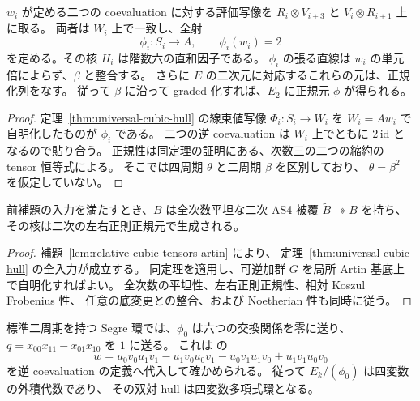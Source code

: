 \begin{lemma}
\label{lem:relative-canonical-hull-functional}
$w_i$ が定める二つの coevaluation に対する評価写像を
$R_i\otimes V_{i+3}$ と $V_i\otimes R_{i+1}$ 上に取る。
両者は $W_i$ 上で一致し、全射
\[
 \phi_i:S_i\longrightarrow A,\qquad \phi_i(w_i)=2
\]
を定める。その核 $H_i$ は階数六の直和因子である。
$\phi_i$ の張る直線は $w_i$ の単元倍によらず、$\beta$ と整合する。
さらに $E$ の二次元に対応するこれらの元は、正規化列をなす。
従って $\beta$ に沿って graded 化すれば、$E_2$ に正規元
$\phi$ が得られる。
\end{lemma}
\begin{proof}
定理~\ref{thm:universal-cubic-hull} の線束値写像
$\Phi_i:S_i\to W_i$ を $W_i=Aw_i$ で自明化したものが $\phi_i$ である。
二つの逆 coevaluation は $W_i$ 上でともに $2\,\mathrm{id}$ となるので貼り合う。
正規性は同定理の証明にある、次数三の二つの縮約の tensor 恒等式による。
そこでは四周期 $\theta$ と二周期 $\beta$ を区別しており、
$\theta=\beta^2$ を仮定していない。
\end{proof}

\begin{proposition}
\label{prop:relative-artin-hull-from-functional}
前補題の入力を満たすとき、$B$ は全次数平坦な二次 AS4 被覆
$\widetilde B\twoheadrightarrow B$ を持ち、その核は二次の左右正則正規元で生成される。
\end{proposition}
\begin{proof}
補題~\ref{lem:relative-cubic-tensors-artin} により、
定理~\ref{thm:universal-cubic-hull} の全入力が成立する。
同定理を適用し、可逆加群 $G$ を局所 Artin 基底上で自明化すればよい。
全次数の平坦性、左右正則正規性、相対 Koszul Frobenius 性、
任意の底変更との整合、および Noetherian 性も同時に従う。
\end{proof}

\begin{remark}[可換ファイバーでの正規化]
標準二周期を持つ Segre 環では、$\phi_0$ は六つの交換関係を零に送り、
$q=x_{00}x_{11}-x_{01}x_{10}$ を $1$ に送る。
これは \cite[(5.3)]{VdB2011} の
\[
 w=u_0v_0u_1v_1-u_1v_0u_0v_1-u_0v_1u_1v_0+u_1v_1u_0v_0
\]
を逆 coevaluation の定義へ代入して確かめられる。
従って $E_k/(\phi_0)$ は四変数の外積代数であり、
その双対 hull は四変数多項式環となる。
\end{remark}


